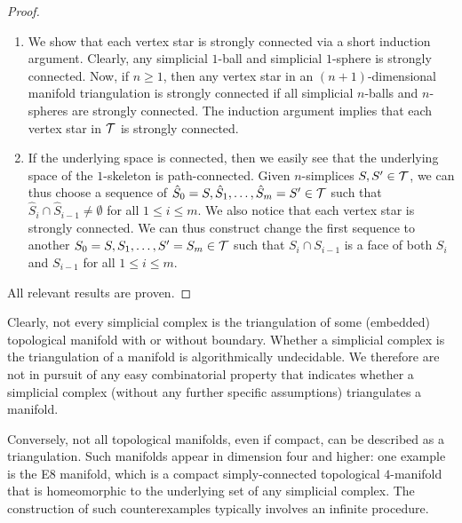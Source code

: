 \documentclass[a4paper]{article}
\begin{document}
\begin{proof}
\begin{enumerate}
    \item 
    We show that each vertex star is strongly connected via a short induction argument.
    Clearly, any simplicial $1$-ball and simplicial $1$-sphere is strongly connected. 
    Now, if $n \geq 1$, then any vertex star in an $(n+1)$-dimensional manifold triangulation is strongly connected if all simplicial $n$-balls and $n$-spheres are strongly connected.
    The induction argument implies that each vertex star in ${\mathcal T}$ is strongly connected.

    \item 
    If the underlying space is connected, then we easily see that the underlying space of the $1$-skeleton is path-connected.
    Given $n$-simplices $S,S' \in {\mathcal T}$, 
    we can thus choose a sequence of $\hat S_0=S,\hat S_1,\dots,\hat S_m=S' \in {\mathcal T}$ such that $\hat S_{i} \cap \hat S_{i-1} \neq \emptyset$ for all $1 \leq i \leq m$.
    We also notice that each vertex star is strongly connected. 
    We can thus construct change the first sequence to another $S_0=S,S_1,\dots,S'=S_m \in {\mathcal T}$ 
    such that $S_{i} \cap S_{i-1}$ is a face of both $S_{i}$ and $S_{i-1}$ for all $1 \leq i \leq m$.
    \end{enumerate}
    All relevant results are proven. 
\end{proof}









\begin{remark}
    Clearly, not every simplicial complex is the triangulation of some (embedded) topological manifold with or without boundary. 
    Whether a simplicial complex is the triangulation of a manifold is algorithmically undecidable. 
    We therefore are not in pursuit of any easy combinatorial property that indicates whether a simplicial complex (without any further specific assumptions) triangulates a manifold.

    Conversely, not all topological manifolds, even if compact, can be described as a triangulation. 
    Such manifolds appear in dimension four and higher:
    one example is the E8 manifold, which is a compact simply-connected topological $4$-manifold that is homeomorphic to the underlying set of any simplicial complex. The construction of such counterexamples typically involves an infinite procedure.
\end{remark}
\end{document}
